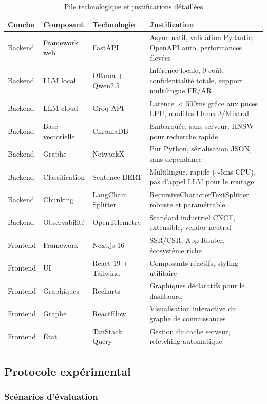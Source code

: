 \documentclass[12pt, a4paper]{article}
\begin{document}
\begin{table}[H]
\centering
\caption{Pile technologique et justifications détaillées}
\label{tab:techstack}
\small
\begin{tabularx}{\textwidth}{l l l X}
\toprule
\textbf{Couche} & \textbf{Composant} & \textbf{Technologie} & \textbf{Justification} \\
\midrule
Backend & Framework web & FastAPI & Async natif, validation Pydantic, OpenAPI auto, performances élevées \\
Backend & LLM local & Ollama + Qwen2.5 & Inférence locale, 0 coût, confidentialité totale, support multilingue FR/AR \\
Backend & LLM cloud & Groq API & Latence $<$500ms grâce aux puces LPU, modèles Llama-3/Mixtral \\
Backend & Base vectorielle & ChromaDB & Embarquée, sans serveur, HNSW pour recherche rapide \\
Backend & Graphe & NetworkX & Pur Python, sérialisation JSON, sans dépendance \\
Backend & Classification & Sentence-BERT & Multilingue, rapide ($\sim$5ms CPU), pas d'appel LLM pour le routage \\
Backend & Chunking & LangChain Splitter & RecursiveCharacterTextSplitter robuste et paramétrable \\
Backend & Observabilité & OpenTelemetry & Standard industriel CNCF, extensible, vendor-neutral \\
\midrule
Frontend & Framework & Next.js 16 & SSR/CSR, App Router, écosystème riche \\
Frontend & UI & React 19 + Tailwind & Composants réactifs, styling utilitaire \\
Frontend & Graphiques & Recharts & Graphiques déclaratifs pour le dashboard \\
Frontend & Graphe & ReactFlow & Visualisation interactive du graphe de connaissances \\
Frontend & État & TanStack Query & Gestion du cache serveur, refetching automatique \\
\bottomrule
\end{tabularx}
\end{table}

\subsection{Protocole expérimental}

\subsubsection{Scénarios d'évaluation}
\end{document}
